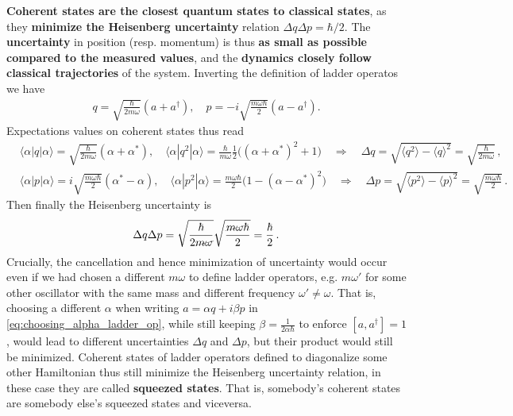 \documentclass[../QFT_main.tex]{subfiles}
\begin{document}
\begin{mytheorem}
\textbf{Coherent states are the closest quantum states to classical states}, as they \textbf{minimize the Heisenberg uncertainty} relation $\Delta q \Delta p = \hbar/2$.
The \textbf{uncertainty} in position (resp. momentum) is thus \textbf{as small as possible compared to the measured values}, and the \textbf{dynamics closely follow classical trajectories} of the system.
Inverting the definition of ladder operatos we have
\begin{align}
    q = \sqrt{\frac{\hbar}{2 m \omega}} (a + a^\dagger), \quad p = -i \sqrt{\frac{m \omega \hbar}{2}} (a - a^\dagger).
\end{align}
Expectations values on coherent states thus read
\begin{align}
    &\langle \alpha| q |\alpha\rangle = \sqrt{\tfrac{\hbar}{2 m \omega}} (\alpha + \alpha^*), 
    \quad \langle \alpha| q^2 |\alpha\rangle = \tfrac{\hbar}{m \omega} \tfrac{1}{2}\Big((\alpha + \alpha^*)^2 +1\Big) \quad \Rightarrow \quad \Delta q = \sqrt{\langle q^2 \rangle - \langle q \rangle^2} = \sqrt{\frac{\hbar}{2 m \omega}}\,,\\
    &\langle \alpha| p |\alpha\rangle = i \sqrt{\tfrac{m \omega \hbar}{2}} (\alpha^* - \alpha),
    \quad \langle \alpha| p^2 |\alpha\rangle = \tfrac{m \omega \hbar}{2} \Big(1-(\alpha - \alpha^*)^2 \Big) \quad \Rightarrow \quad \Delta p = \sqrt{\langle p^2 \rangle - \langle p \rangle^2} = \sqrt{\frac{m \omega \hbar}{2}}\,.
\end{align}
Then finally the Heisenberg uncertainty is
\begin{align}
    \Delta q \Delta p = \sqrt{\frac{\hbar}{2 \graycancel{m \omega}}} \sqrt{\frac{\graycancel{m \omega} \hbar}{2}} = \frac{\hbar}{2}\,.
\end{align}
Crucially, the cancellation and hence minimization of uncertainty would occur even if we had chosen a different $m\omega$ to define ladder operators, e.g. $m\omega'$ for some other oscillator with the same mass and different frequency $\omega'\neq \omega$.
That is, choosing a different $\alpha$ when writing $a=\alpha q + i \beta p$ in \eqref{eq:choosing_alpha_ladder_op}, while still keeping $\beta=\frac{1}{2\alpha \hbar}$ to enforce $[a,a^\dagger]=1$, would lead to different uncertainties $\Delta q$ and $\Delta p$, but their product would still be minimized.
Coherent states of ladder operators defined to diagonalize some other Hamiltonian thus still minimize the Heisenberg uncertainty relation, in these case they are called \textbf{squeezed states}.
That is, somebody's coherent states are somebody else's squeezed states and viceversa.
\end{mytheorem}
\end{document}
